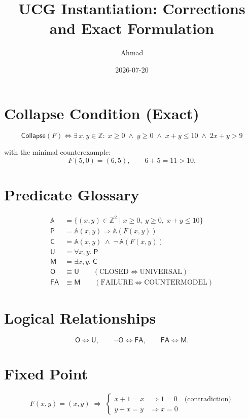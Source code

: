 \documentclass{article}
\title{UCG Instantiation: Corrections and Exact Formulation}
\author{Ahmad}
\date{2026-07-20}
\begin{document}
\maketitle

\section*{Collapse Condition (Exact)}

\[
\boxed{
\mathsf{Collapse}(F)
\iff
\exists\, x,y \in \mathbb{Z} :\;
x \ge 0 \;\land\; y \ge 0 \;\land\; x+y \le 10 \;\land\; 2x+y > 9
}
\]

with the minimal counterexample:
\[
F(5,0) = (6,5), \qquad 6+5 = 11 > 10.
\]

\section*{Predicate Glossary}

\begin{align*}
\mathbb{A}    &= \bigl\{(x,y) \in \mathbb{Z}^2 \mid x \ge 0,\; y \ge 0,\; x+y \le 10\bigr\} \\[4pt]
\mathsf{P}    &= \mathbb{A}(x,y) \Rightarrow \mathbb{A}(F(x,y)) \\[4pt]
\mathsf{C}    &= \mathbb{A}(x,y) \;\land\; \lnot\,\mathbb{A}(F(x,y)) \\[4pt]
\mathsf{U}    &= \forall x,y.\; \mathsf{P} \\[4pt]
\mathsf{M}    &= \exists x,y.\; \mathsf{C} \\[4pt]
\mathsf{O}    &\equiv \mathsf{U} \qquad (\text{CLOSED} \Leftrightarrow \text{UNIVERSAL}) \\[4pt]
\mathsf{FA}   &\equiv \mathsf{M} \qquad (\text{FAILURE} \Leftrightarrow \text{COUNTERMODEL})
\end{align*}

\section*{Logical Relationships}

\[
\mathsf{O} \Leftrightarrow \mathsf{U}, \qquad
\lnot\mathsf{O} \Leftrightarrow \mathsf{FA}, \qquad
\mathsf{FA} \Leftrightarrow \mathsf{M}.
\]

\section*{Fixed Point}

\[
F(x,y) = (x,y) \;\Longrightarrow\;
\begin{cases}
x+1 = x & \Rightarrow 1 = 0 \quad \text{(contradiction)}\\
y+x = y & \Rightarrow x = 0
\end{cases}
\]
\end{document}

